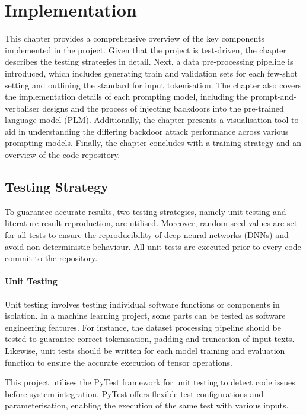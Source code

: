 \chapter{Implementation}
This chapter provides a comprehensive overview of the key components implemented in the project. Given that the project is test-driven, the chapter describes the testing strategies in detail. Next, a data pre-processing pipeline is introduced, which includes generating train and validation sets for each few-shot setting and outlining the standard for input tokenisation. The chapter also covers the implementation details of each prompting model, including the prompt-and-verbaliser designs and the process of injecting backdoors into the pre-trained language model (PLM). Additionally, the chapter presents a visualisation tool to aid in understanding the differing backdoor attack performance across various prompting models. Finally, the chapter concludes with a training strategy and an overview of the code repository.

\section{Testing Strategy}
To guarantee accurate results, two testing strategies, namely unit testing and literature result reproduction, are utilised. Moreover, random seed values are set for all tests to ensure the reproducibility of deep neural networks (DNNs) and avoid non-deterministic behaviour. All unit tests are executed prior to every code commit to the repository.

\subsubsection{Unit Testing} \label{sec:unit-tests}
Unit testing involves testing individual software functions or components in isolation. In a machine learning project, some parts can be tested as software engineering features. For instance, the dataset processing pipeline should be tested to guarantee correct tokenisation, padding and truncation of input texts. Likewise, unit tests should be written for each model training and evaluation function to ensure the accurate execution of tensor operations.

This project utilises the PyTest framework \cite{pytest2004} for unit testing to detect code issues before system integration. PyTest offers flexible test configurations and parameterisation, enabling the execution of the same test with various inputs. 

